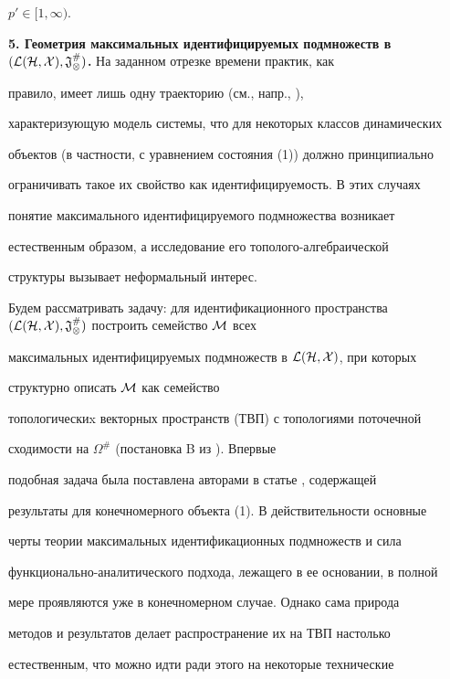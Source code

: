 $p'\in[1,\infty)$. 


\medskip 


 


{\bf 5. Геометрия максимальных идентифицируемых подмножеств в $(\cal 


L(H,X),\frak J^{\#}_\Omega)$.} На заданном отрезке времени практик, как 


правило, имеет лишь одну траекторию (см., напр., \cite{6}), 


характеризующую модель системы, что для некоторых классов динамических 


объектов (в частности, с уравнением состояния (1)) должно принципиально 


ограничивать такое их свойство как идентифицируемость. В этих случаях 


понятие максимального идентифицируемого подмножества возникает 


естественным образом, а исследование его тополого-алгебраической 


структуры вызывает неформальный интерес. 


 


Будем рассматривать задачу: для идентификационного пространства $(\cal 


L(H,X),\frak J^{\#}_\Omega)$ построить семейство $\cal M$ всех 


максимальных идентифицируемых подмножеств в $\cal L(H,X)$, при которых 


структурно описать $\cal M$ как семейство


топологическиx векторных пространств (ТВП) с топологиями поточечной 


сходимости на $\Omega^{\#}$ (постановка B из \cite{1}). Впервые 


подобная задача была поставлена авторами в статье \cite{2}, содержащей 


результаты для конечномерного объекта (1). В действительности основные 


черты теории максимальных идентификационных подмножеств и сила 


функционально-аналитического подхода, лежащего в ее основании, в полной 


мере проявляются уже в конечномерном случае. Однако сама природа 


методов и результатов делает распространение их на ТВП настолько 


естественным, что можно идти ради этого на некоторые технические 


